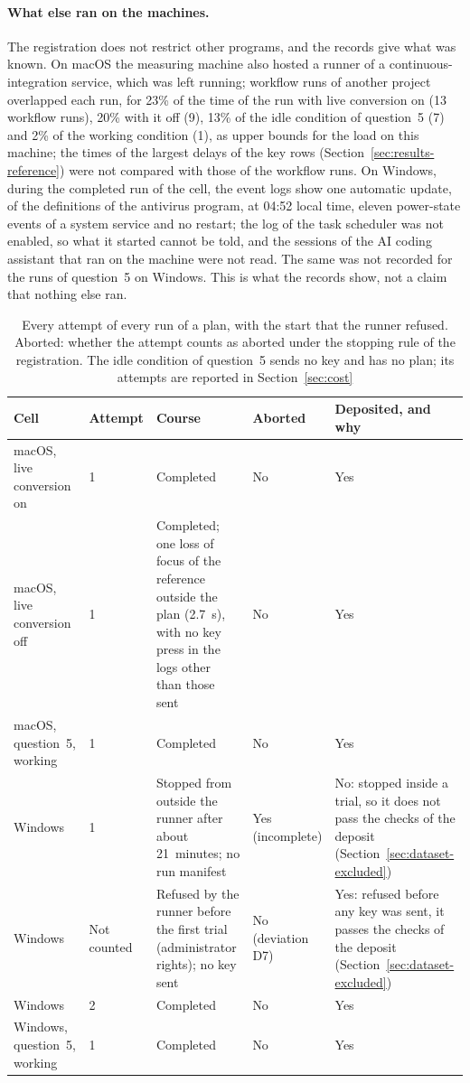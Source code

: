 \paragraph{What else ran on the machines.} The registration does not restrict other programs, and the records give what
was known. On macOS the measuring machine also hosted a runner of a continuous-integration service, which was left
running; workflow runs of another project overlapped each run, for 23\% of the time of the run with live conversion on
(13 workflow runs), 20\% with it off (9), 13\% of the idle condition of question~5 (7) and 2\% of the working condition
(1), as upper bounds for the load on this machine; the times of the largest delays of the key rows
(Section~\ref{sec:results-reference}) were not compared with those of the workflow runs. On Windows, during the
completed run of the cell, the event logs show
one automatic update, of the definitions of the antivirus program, at 04:52 local time, eleven power-state events of a
system service and no restart; the log of the task scheduler was not enabled, so what it started cannot be told, and the
sessions of the AI coding assistant that ran on the machine were not read. The same was not recorded for the runs of
question~5 on Windows. This is what the records show, not a claim that nothing else ran.

\begin{table}[t]
\caption{Every attempt of every run of a plan, with the start that the runner refused. Aborted: whether the attempt
counts as aborted under the stopping rule of the registration. The idle condition of question~5 sends no key and has no
plan; its attempts are reported in Section~\ref{sec:cost}}
\label{tab:attempts}
\begin{tabular}{L{0.17}L{0.13}L{0.32}L{0.12}L{0.26}}
\toprule
Cell & Attempt & Course & Aborted & Deposited, and why \\
\midrule
macOS, live conversion on & 1 & Completed & No & Yes \\
macOS, live conversion off & 1 & Completed; one loss of focus of the reference outside the plan (2.7~s), with no key
press in the logs other than those sent & No & Yes \\
macOS, question~5, working & 1 & Completed & No & Yes \\
Windows & 1 & Stopped from outside the runner after about 21~minutes; no run manifest & Yes (incomplete) & No: stopped
inside a trial, so it does not pass the checks of the deposit (Section~\ref{sec:dataset-excluded}) \\
Windows & Not counted & Refused by the runner before the first trial (administrator rights); no key sent & No
(deviation D7) & Yes: refused before any key was sent, it passes the checks of the deposit
(Section~\ref{sec:dataset-excluded}) \\
Windows & 2 & Completed & No & Yes \\
Windows, question~5, working & 1 & Completed & No & Yes \\
\bottomrule
\end{tabular}
\end{table}

